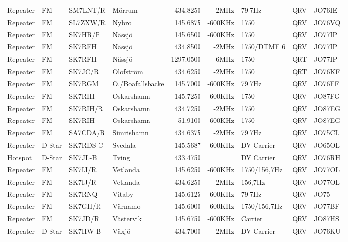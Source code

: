 \begin{longtable}{llllrrlcl}
Repeater & FM     & SM7LNT/R & Mörrum              & 434.8250  & -2MHz   & 79,7Hz       & QRV  & JO76IE \\
Repeater & FM     & SL7ZXW/R & Nybro               & 145.6875  & -600KHz & 1750         & QRV  & JO76VQ \\
Repeater & FM     & SK7HR/R  & Nässjö              & 145.6500  & -600KHz & 1750         & QRV  & JO77IP \\
Repeater & FM     & SK7RFH   & Nässjö              & 434.8500  & -2MHz   & 1750/DTMF 6  & QRV  & JO77IP \\
Repeater & FM     & SK7RFH   & Nässjö              & 1297.0500 & -6MHz   & 1750         & QRT  & JO77IP \\
Repeater & FM     & SK7JC/R  & Olofström           & 434.6250  & -2MHz   & 1750         & QRT  & JO76KF \\
Repeater & FM     & SK7RGM   & O./Boafallsbacke    & 145.7000  & -600KHz & 79,7Hz       & QRV  & JO76FF \\
Repeater & FM     & SK7RIH   & Oskarshamn          & 145.7250  & -600KHz & 1750         & QRV  & JO87FG \\
Repeater & FM     & SK7RIH/R & Oskarshamn          & 434.7250  & -2MHz   & 1750         & QRV  & JO87EG \\
Repeater & FM     & SK7RIH   & Oskarshamn          & 51.9100   & -600KHz & 1750         & QRV  & JO87EG \\
Repeater & FM     & SA7CDA/R & Simrishamn          & 434.6375  & -2MHz   & 79,7Hz       & QRV  & JO75CL \\
Repeater & D-Star & SK7RDS-C & Svedala             & 145.5687  & -600KHz & DV Carrier   & QRV  & JO65OL \\
Hotspot  & D-Star & SK7JL-B  & Tving               & 433.4750  &         & DV Carrier   & QRV  & JO76RH \\
Repeater & FM     & SK7IJ/R  & Vetlanda            & 145.6250  & -600KHz & 1750/156,7Hz & QRV  & JO77OL \\
Repeater & FM     & SK7IJ/R  & Vetlanda            & 434.6250  & -2MHz   & 156,7Hz      & QRV  & JO77OL \\
Repeater & FM     & SK7RNQ   & Vitaby              & 145.6125  & -600KHz & 79,7Hz       & QRV  & JO75   \\
Repeater & FM     & SK7GH/R  & Värnamo             & 145.6000  & -600KHz & 1750/156,7Hz & QRV  & JO77BF \\
Repeater & FM     & SK7JD/R  & Västervik           & 145.6750  & -600KHz & Carrier      & QRV  & JO87HS \\
Repeater & D-Star & SK7HW-B  & Växjö               & 434.7000  & -2MHz   & DV Carrier   & QRV  & JO76KU

\end{longtable}
\normalsize
\clearpage

